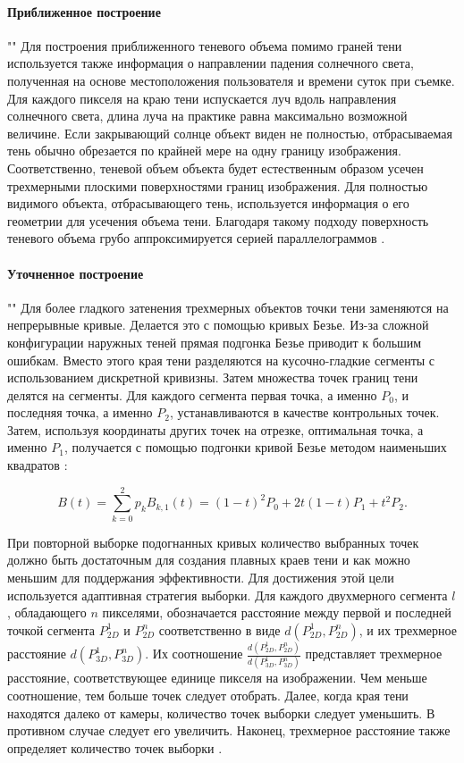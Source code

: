 \paragraph*{Приближенное построение}
""\newline\indent
Для построения приближенного теневого объема помимо граней тени используется также информация о направлении падения солнечного света, полученная на основе местоположения пользователя и времени суток при съемке. Для каждого пикселя на краю тени испускается луч вдоль направления солнечного света, длина луча на практике равна максимально возможной величине. Если закрывающий солнце объект виден не полностью, отбрасываемая тень обычно обрезается по крайней мере на одну границу изображения. Соответственно,  теневой объем объекта будет естественным образом усечен трехмерными плоскими поверхностями границ изображения. Для полностью видимого объекта, отбрасывающего тень, используется информация о его геометрии для усечения объема тени. Благодаря такому подходу поверхность теневого объема грубо аппроксимируется серией параллелограммов \cite{wei2019simulating}.

\paragraph*{Уточненное построение} 
""\newline\indent
Для более гладкого затенения трехмерных объектов точки тени заменяются на непрерывные кривые. Делается это с помощью кривых Безье. Из-за сложной конфигурации наружных теней прямая подгонка Безье приводит к большим ошибкам. Вместо этого края тени разделяются на кусочно-гладкие сегменты с использованием дискретной кривизны. Затем множества точек границ тени делятся на сегменты. Для каждого сегмента первая точка, а именно $P_0$, и последняя точка, а именно $P_2$, устанавливаются в качестве контрольных точек. Затем, используя координаты других точек на отрезке, оптимальная точка, а именно $P_1$, получается с помощью подгонки кривой Безье методом наименьших квадратов \cite{wei2019simulating}:

\begin{equation}
	B(t) = \sum_{k=0}^{2} p_k B_{k, 1} (t) = (1 - t) ^ 2 P_0 + 2t(1 - t)P_1 + t^2 P_2.
\end{equation}

При повторной выборке подогнанных кривых количество выбранных точек должно быть достаточным для создания плавных краев тени и как можно меньшим для поддержания эффективности. Для достижения этой цели используется адаптивная стратегия выборки. Для каждого двухмерного сегмента $l$, обладающего $n$ пикселями, обозначается расстояние между первой и последней точкой сегмента $P_{2D}^1$ и $P_{2D}^n$ соответственно в виде $d(P_{2D}^1, P_{2D}^n)$, и их трехмерное расстояние $d(P_{3D}^1, P_{3D}^n)$. Их соотношение $\frac{d(P_{2D}^1, P_{2D}^n)}{d(P_{3D}^1, P_{3D}^n)}$ представляет трехмерное расстояние, соответствующее единице пикселя на изображении. Чем меньше соотношение, тем больше точек следует отобрать. Далее, когда края тени находятся далеко от камеры, количество точек выборки следует уменьшить. В противном случае следует его увеличить. Наконец, трехмерное расстояние также определяет количество точек выборки \cite{wei2019simulating}.

